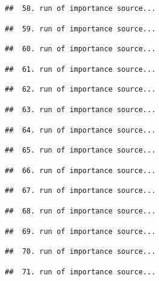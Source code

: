 \documentclass[
]{article}
\begin{document}
\begin{verbatim}
##  58. run of importance source...
\end{verbatim}

\begin{verbatim}
##  59. run of importance source...
\end{verbatim}

\begin{verbatim}
##  60. run of importance source...
\end{verbatim}

\begin{verbatim}
##  61. run of importance source...
\end{verbatim}

\begin{verbatim}
##  62. run of importance source...
\end{verbatim}

\begin{verbatim}
##  63. run of importance source...
\end{verbatim}

\begin{verbatim}
##  64. run of importance source...
\end{verbatim}

\begin{verbatim}
##  65. run of importance source...
\end{verbatim}

\begin{verbatim}
##  66. run of importance source...
\end{verbatim}

\begin{verbatim}
##  67. run of importance source...
\end{verbatim}

\begin{verbatim}
##  68. run of importance source...
\end{verbatim}

\begin{verbatim}
##  69. run of importance source...
\end{verbatim}

\begin{verbatim}
##  70. run of importance source...
\end{verbatim}

\begin{verbatim}
##  71. run of importance source...
\end{verbatim}
\end{document}

